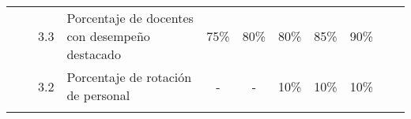 \begin{table}[]
{\begin{tabular}{|llllccccccc|}
\rowcolor[HTML]{FFFFFF} 
\multicolumn{1}{|l|}{\cellcolor[HTML]{FFFFFF}}                                                     & \multicolumn{1}{l|}{\cellcolor[HTML]{FFFFFF}}                                                                                                                                                                                                       & \multicolumn{1}{l|}{\cellcolor[HTML]{FFFFFF}3.3}                                                  & \multicolumn{1}{l|}{\cellcolor[HTML]{FFFFFF}Porcentaje de docentes con desempeño destacado}                                                                                    & \multicolumn{1}{c|}{\cellcolor[HTML]{FFFFFF}75\%}                                 & \multicolumn{1}{c|}{\cellcolor[HTML]{FFFFFF}80\%}                                 & \multicolumn{1}{c|}{\cellcolor[HTML]{FFFFFF}80\%}                                 & \multicolumn{1}{c|}{\cellcolor[HTML]{FFFFFF}85\%}                                 & \multicolumn{1}{c|}{\cellcolor[HTML]{FFFFFF}90\%}                                 & \multicolumn{1}{c|}{\cellcolor[HTML]{FFFFFF}}                                     &                                                                                   \\ \cline{3-11} 
\rowcolor[HTML]{FFFFFF} 
\multicolumn{1}{|l|}{\cellcolor[HTML]{FFFFFF}}                                                     & \multicolumn{1}{l|}{\cellcolor[HTML]{FFFFFF}}                                                                                                                                                                                                       & \multicolumn{1}{l|}{\cellcolor[HTML]{FFFFFF}3.2}                                                  & \multicolumn{1}{l|}{\cellcolor[HTML]{FFFFFF}Porcentaje de rotación de personal}                                                                                                & \multicolumn{1}{c|}{\cellcolor[HTML]{FFFFFF}-}                                    & \multicolumn{1}{c|}{\cellcolor[HTML]{FFFFFF}-}                                    & \multicolumn{1}{c|}{\cellcolor[HTML]{FFFFFF}10\%}                                 & \multicolumn{1}{c|}{\cellcolor[HTML]{FFFFFF}10\%}                                 & \multicolumn{1}{c|}{\cellcolor[HTML]{FFFFFF}10\%}                                 & \multicolumn{1}{c|}{\cellcolor[HTML]{FFFFFF}}                                     &                                                                                   \\ \cline{3-11} 
\rowcolor[HTML]{FFFFFF} 

\end{tabular}}
\end{table}
